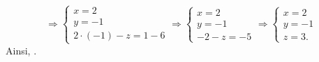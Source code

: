                               \[
                                    \Rightarrow
                                    \left\lbrace
	                                    \begin{array}{l}
	                                           x =  2       \\
	                                           y = -1       \\
	                                           2 \cdot (-1) -   z =   1 -6 
	                                    \end{array}
                                    \right.
                                    \Rightarrow
                                    \left\lbrace
	                                    \begin{array}{l}
	                                           x =  2 \\
	                                           y = -1 \\
	                                           - 2 - z = -5
	                                    \end{array}
                                    \right.
                                    \Rightarrow
                                    \left\lbrace
	                                    \begin{array}{l}
	                                           x =  2 \\
	                                           y = -1 \\
	                                           z =  3 .
	                                    \end{array}
                                    \right.
                              \]
                  Ainsi, .
